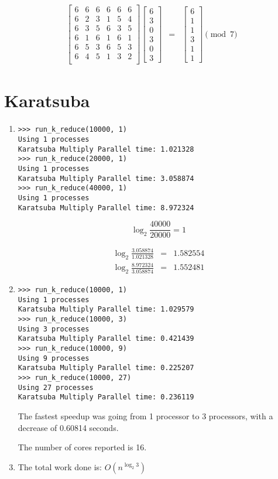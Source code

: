 \documentclass[11pt]{article}
\begin{document}
\begin{enumerate}
\begin{eqnarray*}
\begin{bmatrix}
6&6&6&6&6&6\\
6&2&3&1&5&4\\
6&3&5&6&3&5\\
6&1&6&1&6&1\\
6&5&3&6&5&3\\
6&4&5&1&3&2\\
\end{bmatrix}
\begin{bmatrix}
6\\
3\\
0\\
3\\
0\\
3
\end{bmatrix}
&=& 
\begin{bmatrix}
6\\
1\\
1\\
3\\
1\\
1
\end{bmatrix}
\pmod{7}
\end{eqnarray*}

\end{enumerate}
\newpage
\section{Karatsuba}

\begin{enumerate}
\item
\begin{verbatim}
>>> run_k_reduce(10000, 1)
Using 1 processes
Karatsuba Multiply Parallel time: 1.021328
>>> run_k_reduce(20000, 1)
Using 1 processes
Karatsuba Multiply Parallel time: 3.058874
>>> run_k_reduce(40000, 1)
Using 1 processes
Karatsuba Multiply Parallel time: 8.972324
\end{verbatim}
\begin{equation*}
\log_2 \frac{40000}{20000} = 1
\end{equation*}

\begin{eqnarray*}
\log_2 \frac{3.058874}{1.021328} &=&  1.582554\\
\log_2 \frac{8.972324}{3.058874} &=&  1.552481
\end{eqnarray*}
\item
\begin{verbatim}
>>> run_k_reduce(10000, 1)
Using 1 processes
Karatsuba Multiply Parallel time: 1.029579
>>> run_k_reduce(10000, 3)
Using 3 processes
Karatsuba Multiply Parallel time: 0.421439
>>> run_k_reduce(10000, 9)
Using 9 processes
Karatsuba Multiply Parallel time: 0.225207
>>> run_k_reduce(10000, 27)
Using 27 processes
Karatsuba Multiply Parallel time: 0.236119
\end{verbatim}
The fastest speedup was going from 1 processor to 3 processors, with a decrease
of 0.60814 seconds.

The number of cores reported is 16.
\item
The total work done is: $O(n^{\log_2 3})$
\end{enumerate}
\end{document}
